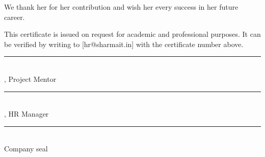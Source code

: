 \documentclass[10pt]{article}
\begin{document}
We thank her for her contribution and wish her every success in her future career.\par\vspace{4pt}

This certificate is issued on request for academic and professional purposes. It can be verified by writing to [hr@sharmait.in] with the certificate number above.\par\vspace{4pt}

\vspace{24pt}

\vspace{32pt}\noindent\parbox[t]{0.3\linewidth}{\centering\rule{\linewidth}{0.5pt}\\ [Anil Joshi], Project Mentor}\hfill\parbox[t]{0.3\linewidth}{\centering\rule{\linewidth}{0.5pt}\\ [Meera Kulkarni], HR Manager}\hfill\parbox[t]{0.3\linewidth}{\centering\rule{\linewidth}{0.5pt}\\ Company seal}\par
\end{document}
